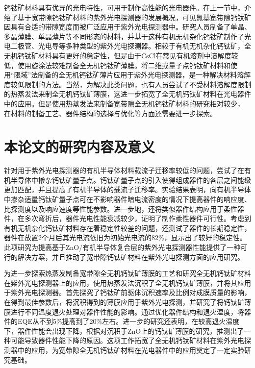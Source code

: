 \documentclass[forlib]{WHUMaster}   %
\begin{document}
{钙钛矿材料具有优异的光电特性，可用于制作高性能的光电器件。在上一节中，介绍了基于宽带隙钙钛矿材料的紫外光电探测器的发展概况，可见氯基宽带隙钙钛矿因具有合适的带隙宽度而被广泛应用于紫外光电探测器中。研究人员制备了单晶、多晶薄膜、单晶薄片等不同形态的材料，并基于这种有机无机杂化钙钛矿制作了光电二极管、光电导等多种类型的紫外光电探测器。相较于有机无机杂化钙钛矿，全无机钙钛矿材料具有更好的稳定性，但是由于CsCl在常见有机溶剂中溶解度较低，使用旋涂法较难制备全无机钙钛矿薄膜。将二维或量子点钙钛矿材料和使用“限域”法制备的全无机钙钛矿薄片应用于紫外光电探测器，是一种解决材料溶解度较低限制的方法。当然，为解决此类问题，也有人员尝试了不受材料溶解度限制的热蒸发法来制全无机钙钛矿薄膜，这进一步拓宽了全无机钙钛矿材料在光电器件中的应用。但是使用热蒸发法来制备宽带隙全无机钙钛矿材料的研究相对较少， 在材料的制备工艺、器件结构的选择与优化等方面还需要进一步探索。

\section{本论文的研究内容及意义}

针对用于紫外光电探测器的有机半导体材料载流子迁移率较低的问题，尝试了在有机半导体中掺杂钙钛矿量子点。钙钛矿量子点的引入使得组成器件的各层之间能级更加匹配，并且提高了有机半导体的载流子迁移率。实验结果表明，向有机半导体中掺杂适量钙钛矿量子点可在不影响器件暗电流密度的情况下提高器件的响应度、比探测度以及响应速度等性能参数。进一步地，还将类似器件结构应用于柔性器件，在多次弯折后，器件光电性能衰减较少，证明了制作柔性器件可行性。考虑到有机无机杂化钙钛矿材料存在着稳定性较差的问题，还测试了器件的长期稳定性，器件在放置2个月后其光电流依旧为初始光电流的82\%，显示出了较好的稳定性。此项研究为提高基于ZnO/有机半导体复合层的紫外光电探测器性能提供了一种可行的解决方案，并且推动了宽带隙钙钛矿材料在紫外光电探测方面的应用研究。

为进一步探索热蒸发制备宽带隙全无机钙钛矿薄膜的工艺和研究全无机钙钛矿材料在紫外光电探测器上的应用，使用热蒸发法沉积了全无机钙钛矿薄膜，并将其应用于紫外光电探测器。首先探究了钙钛矿前驱体沉积速率及比例对成膜质量的影响，在得到最佳参数后，将沉积得到的薄膜应用于紫外光电探测，并研究了将钙钛矿薄膜进行不同温度退火处理对器件性能的影响。通过优化器件结构和退火温度，将器件的EQE从不到5\%提高到了20\%左右。进一步的研究还表明，在较高退火温度下，器件性能会出现下降，根据对沉积于ZnO上的钙钛矿薄膜的研究，推测出了一种可能导致器件性能下降的原因。这项工作拓宽了全无机钙钛矿材料在紫外光电探测器中的应用，为宽带隙全无机钙钛矿材料在光电器件中的应用奠定了一定实验研究基础。

}
\end{document}
